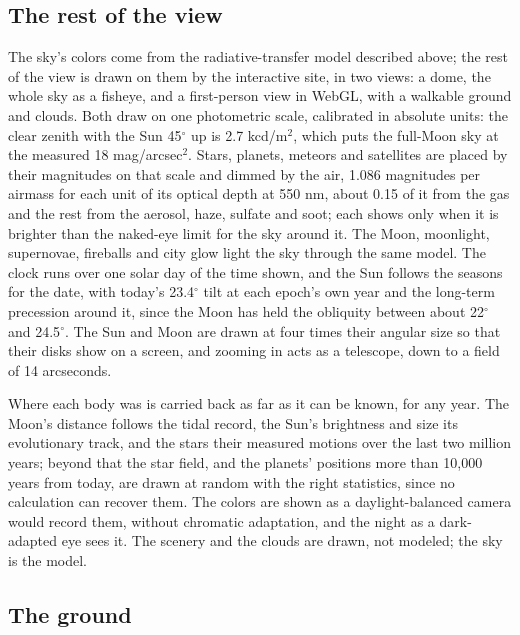 \documentclass[9pt,twocolumn]{extarticle}
\begin{document}
\subsection{The rest of the view}\label{method-view}

The sky's colors come from the radiative-transfer model described above; the rest of the view is drawn on them by the interactive site, in two views: a dome, the whole sky as a fisheye, and a first-person view in WebGL, with a walkable ground and clouds. Both draw on one photometric scale, calibrated in absolute units: the clear zenith with the Sun 45$^\circ$ up is 2.7 kcd/m$^{2}$, which puts the full-Moon sky at the measured 18 mag/arcsec$^{2}$. Stars, planets, meteors and satellites are placed by their magnitudes on that scale and dimmed by the air, 1.086 magnitudes per airmass for each unit of its optical depth at 550 nm, about 0.15 of it from the gas and the rest from the aerosol, haze, sulfate and soot; each shows only when it is brighter than the naked-eye limit for the sky around it. The Moon, moonlight, supernovae, fireballs and city glow light the sky through the same model. The clock runs over one solar day of the time shown, and the Sun follows the seasons for the date, with today's 23.4$^\circ$ tilt at each epoch's own year and the long-term precession around it, since the Moon has held the obliquity between about 22$^\circ$ and 24.5$^\circ$. The Sun and Moon are drawn at four times their angular size so that their disks show on a screen, and zooming in acts as a telescope, down to a field of 14 arcseconds.

Where each body was is carried back as far as it can be known, for any year. The Moon's distance follows the tidal record, the Sun's brightness and size its evolutionary track, and the stars their measured motions over the last two million years; beyond that the star field, and the planets' positions more than 10,000 years from today, are drawn at random with the right statistics, since no calculation can recover them. The colors are shown as a daylight-balanced camera would record them, without chromatic adaptation, and the night as a dark-adapted eye sees it. The scenery and the clouds are drawn, not modeled; the sky is the model.


\subsection{The ground}\label{ground}
\end{document}
